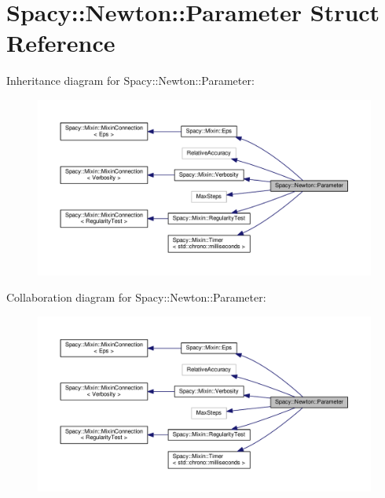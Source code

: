\hypertarget{structSpacy_1_1Newton_1_1Parameter}{}\section{Spacy\+:\+:Newton\+:\+:Parameter Struct Reference}
\label{structSpacy_1_1Newton_1_1Parameter}


Inheritance diagram for Spacy\+:\+:Newton\+:\+:Parameter\+:
\nopagebreak
\begin{figure}[H]
\begin{center}
\leavevmode
\includegraphics[width=350pt]{structSpacy_1_1Newton_1_1Parameter__inherit__graph}
\end{center}
\end{figure}


Collaboration diagram for Spacy\+:\+:Newton\+:\+:Parameter\+:
\nopagebreak
\begin{figure}[H]
\begin{center}
\leavevmode
\includegraphics[width=350pt]{structSpacy_1_1Newton_1_1Parameter__coll__graph}
\end{center}
\end{figure}
